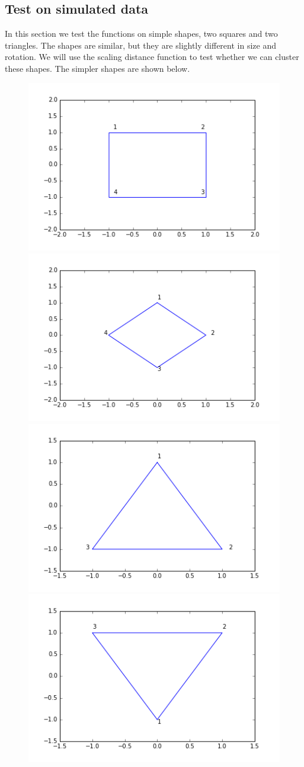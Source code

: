 \documentclass[codesnippet]{jss}
\begin{document}
\subsection{Test on simulated data}
In this section we test the functions on simple shapes, two squares and two triangles.  The shapes are similar, but they are slightly different in size and rotation.  We will use the scaling distance function to test whether we can cluster these shapes. The simpler shapes are shown below.
\begin{figure}
\centering
\includegraphics[width = .49\textwidth]{../sqr1.png}
\includegraphics[width = .49\textwidth]{../sqr2.png}
\includegraphics[width = .49\textwidth]{../triag1.png}
\includegraphics[width = .49\textwidth]{../triag2.png}
\caption{\label{shapes}}
\end{figure}
\end{document}
